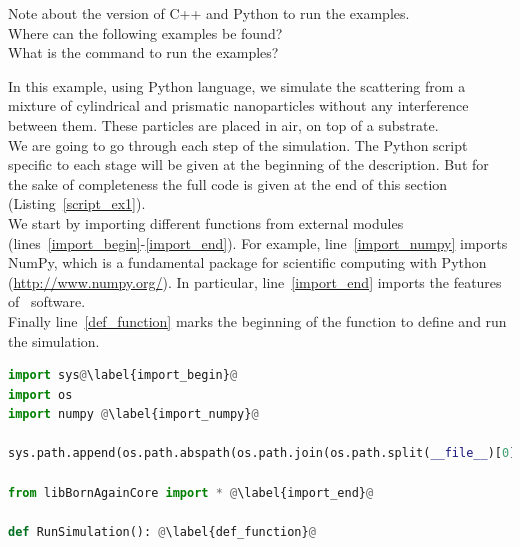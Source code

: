 \noindent Note about the version of C++ and Python to run the
examples.\\

\noindent Where can the following examples be found?\\


\noindent What is the command to run the examples?


In this example, using Python language, we simulate the scattering from a mixture of
cylindrical and prismatic nanoparticles without any interference
between them. These particles are placed in air, on top
of a substrate.\\ We are going to go through each step of the
simulation. The Python script specific to each stage will be given at
the beginning of the description. But for the sake of completeness the full code is given
at the end of this section (Listing~\ref{script_ex1}). \\

\noindent We start by importing different functions from external
modules (lines~\ref{import_begin}-\ref{import_end}). For example,
line~\ref{import_numpy}  imports NumPy, which
is a fundamental package for scientific computing with Python
(\url{http://www.numpy.org/}).  In particular, line~\ref{import_end}
imports the features of \BornAgain\ software.\\

\noindent Finally line~\ref{def_function} marks the beginning of the
function to define and run the simulation. 

\begin{lstlisting}[language=python, style=eclipseboxed,name=ex1,nolol]
import sys@\label{import_begin}@
import os
import numpy @\label{import_numpy}@

sys.path.append(os.path.abspath(os.path.join(os.path.split(__file__)[0],'..', '..', '..', 'lib')))

from libBornAgainCore import * @\label{import_end}@

def RunSimulation(): @\label{def_function}@
\end{lstlisting}


